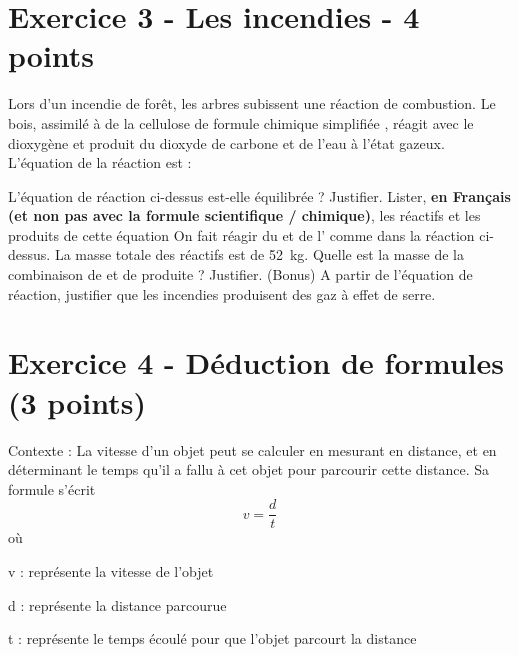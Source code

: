 \documentclass{exam}
\begin{document}
\section*{Exercice 3 - Les incendies - 4 points}

Lors d’un incendie de forêt, les arbres subissent une réaction de combustion. Le bois, assimilé à de
la cellulose de formule chimique simplifiée , réagit avec le dioxygène et produit du dioxyde
de carbone et de l’eau à l’état gazeux. L’équation de la réaction est :

\begin{center}
\end{center}

\begin{questions}
  \question[1.5] L'équation de réaction ci-dessus est-elle équilibrée ? Justifier.
  \question[1] Lister, \textbf{en Français (et non pas avec la formule scientifique / chimique)}, les réactifs et les produits de cette équation
  \question[1] On fait réagir du  et de l' comme dans la réaction ci-dessus. La masse totale des réactifs est de \SI{52}{kg}. Quelle est la masse de la combinaison de  et de  produite ? Justifier. 
  \question[0.5] (Bonus) A partir de l'équation de réaction, justifier que les incendies produisent des gaz à effet de serre.
\end{questions}


\section*{Exercice 4 - Déduction de formules (3 points)}

\begin{tcolorbox}[colback=gray!10!white, colframe=gray, title=Document 1 - La vitesse]
  Contexte : La vitesse d'un objet peut se calculer en mesurant en distance, et en déterminant le temps qu'il a fallu à cet objet pour parcourir cette distance. Sa formule s'écrit
  \[
  v = \frac{d}{t}
  \]
  où 

  \begin{addmargin}[4em]{1em}
    \begin{compactitem}
        \item [v]: représente la vitesse de l'objet
        \item [d]: représente la distance parcourue
        \item [t]: représente le temps écoulé pour que l'objet parcourt la distance
    \end{compactitem}
    \end{addmargin}
  \end{tcolorbox}
\end{document}
